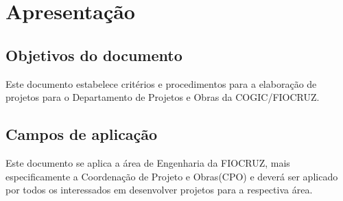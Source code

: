 \section{Apresentação} \label{section: introduction}

\subsection{Objetivos do documento}
Este documento estabelece critérios e procedimentos para a elaboração de projetos para o Departamento de Projetos e Obras da COGIC/FIOCRUZ.

\subsection{Campos de aplicação}
Este documento se aplica a área de Engenharia da FIOCRUZ, mais especificamente a Coordenação de Projeto e Obras(CPO) e deverá ser aplicado por todos os interessados em desenvolver projetos para a respectiva área.